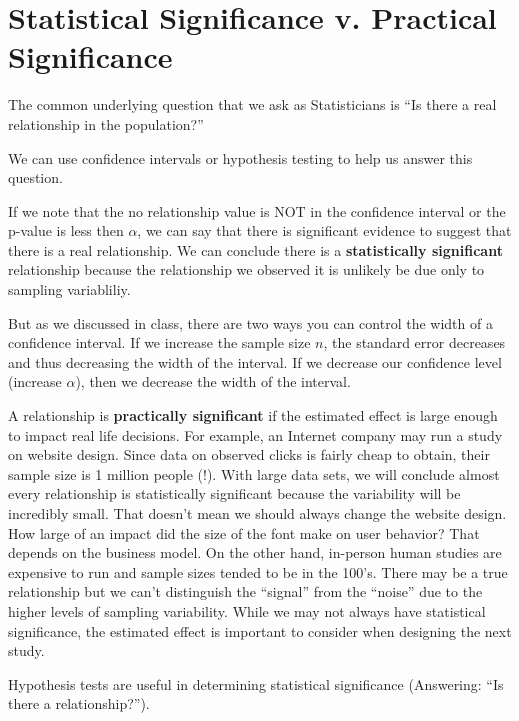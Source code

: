 \documentclass[]{book}
\begin{document}
\hypertarget{statistical-significance-v.-practical-significance}{%
\section{Statistical Significance v. Practical Significance}\label{statistical-significance-v.-practical-significance}}

The common underlying question that we ask as Statisticians is ``Is there a real relationship in the population?''

We can use confidence intervals or hypothesis testing to help us answer this question.

If we note that the no relationship value is NOT in the confidence interval or the p-value is less then \(\alpha\), we can say that there is significant evidence to suggest that there is a real relationship. We can conclude there is a \textbf{statistically significant} relationship because the relationship we observed it is unlikely be due only to sampling variabliliy.

But as we discussed in class, there are two ways you can control the width of a confidence interval. If we increase the sample size \(n\), the standard error decreases and thus decreasing the width of the interval. If we decrease our confidence level (increase \(\alpha\)), then we decrease the width of the interval.

A relationship is \textbf{practically significant} if the estimated effect is large enough to impact real life decisions. For example, an Internet company may run a study on website design. Since data on observed clicks is fairly cheap to obtain, their sample size is 1 million people (!). With large data sets, we will conclude almost every relationship is statistically significant because the variability will be incredibly small. That doesn't mean we should always change the website design. How large of an impact did the size of the font make on user behavior? That depends on the business model. On the other hand, in-person human studies are expensive to run and sample sizes tended to be in the 100's. There may be a true relationship but we can't distinguish the ``signal'' from the ``noise'' due to the higher levels of sampling variability. While we may not always have statistical significance, the estimated effect is important to consider when designing the next study.

Hypothesis tests are useful in determining statistical significance (Answering: ``Is there a relationship?'').
\end{document}
